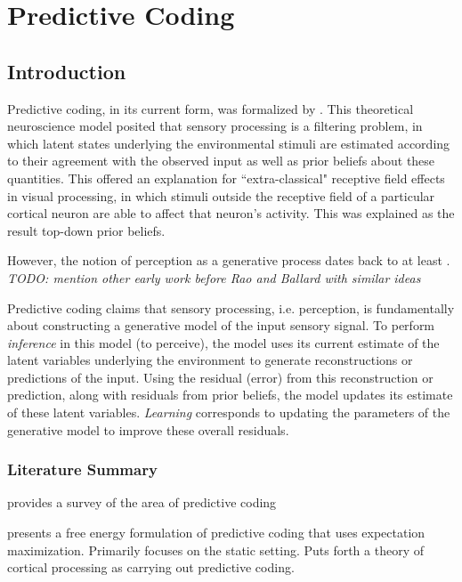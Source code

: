 \chapter{Predictive Coding}

\section{Introduction}

Predictive coding, in its current form, was formalized by \cite{rao1999predictive}. This theoretical neuroscience model posited that sensory processing is a filtering problem, in which latent states underlying the environmental stimuli are estimated according to their agreement with the observed input as well as prior beliefs about these quantities. This offered an explanation for ``extra-classical" receptive field effects in visual processing, in which stimuli outside the receptive field of a particular cortical neuron are able to affect that neuron's activity. This was explained as the result top-down prior beliefs.

However, the notion of perception as a generative process dates back to at least \cite{von1867handbuch}. \textit{TODO: mention other early work before Rao and Ballard with similar ideas}

Predictive coding claims that sensory processing, i.e. perception, is fundamentally about constructing a generative model of the input sensory signal. To perform \textit{inference} in this model (to perceive), the model uses its current estimate of the latent variables underlying the environment to generate reconstructions or predictions of the input. Using the residual (error) from this reconstruction or prediction, along with residuals from prior beliefs, the model updates its estimate of these latent variables. \textit{Learning} corresponds to updating the parameters of the generative model to improve these overall residuals.
\newline

\subsection{Literature Summary}

\noindent \cite{clark2013whatever} provides a survey of the area of predictive coding
\newline

\noindent \cite{friston2002functional, friston2003learning, friston2005theory} presents a free energy formulation of predictive coding that uses expectation maximization. Primarily focuses on the static setting. Puts forth a theory of cortical processing as carrying out predictive coding.
\newline

